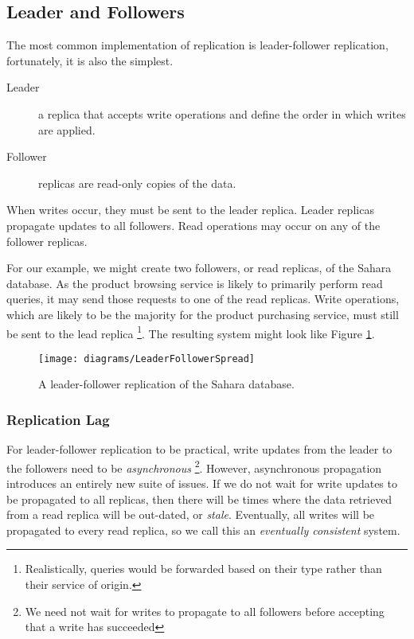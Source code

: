 \subsection{Leader and Followers}
The most common implementation of replication is leader-follower replication,
fortunately, it is also the simplest.

\begin{description}
    \item[Leader] a replica that accepts write operations and define the order in which writes are applied.
    \item[Follower] replicas are read-only copies of the data. 
\end{description}

\noindent
When writes occur, they must be sent to the leader replica.
Leader replicas propagate updates to all followers.
Read operations may occur on any of the follower replicas.

For our example,
we might create two followers, or read replicas,
of the Sahara database.
As the product browsing service is likely to primarily perform read queries,
it may send those requests to one of the read replicas.
Write operations, which are likely to be the majority for the product purchasing service,
must still be sent to the lead replica%
\footnote{Realistically, queries would be forwarded based on their type rather than their service of origin.}.
The resulting system might look like Figure \ref{fig:sahara-leader-follower}.

\begin{figure}[H]
    \begin{center}
    \texttt{[image: diagrams/LeaderFollowerSpread]}
    \end{center}
    \caption{A leader-follower replication of the Sahara database.}
    \label{fig:sahara-leader-follower}
\end{figure}

\subsubsection*{Replication Lag}

For leader-follower replication to be practical,
write updates from the leader to the followers need to be \textsl{asynchronous}%
\footnote{We need not wait for writes to propagate to all followers before accepting that a write has succeeded}.
However, asynchronous propagation introduces an entirely new suite of issues.
If we do not wait for write updates to be propagated to all replicas,
then there will be times where the data retrieved from a read replica will be out-dated, or \textsl{stale}.
Eventually, all writes will be propagated to every read replica,
so we call this an \textsl{eventually consistent} system.


